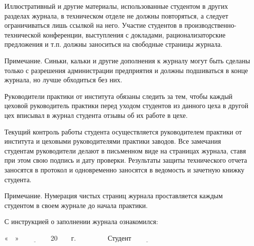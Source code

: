 Иллюстративный и другие материалы, использованные студентом в других разделах журнала, в техническом отделе не должны повторяться, а следует  ограничиваться лишь ссылкой на него. Участие студентов в производственно-технической конференции, выступления с докладами, рационализаторские предложения и т.п. должны заноситься на свободные страницы журнала.


Примечание. Синьки, кальки и другие дополнения к журналу могут быть сделаны только с разрешения администрации предприятия и должны подшиваться в конце журнала, но лучше обходиться без них.

Руководители практики от института обязаны следить за тем, чтобы каждый цеховой руководитель практики перед уходом студентов из данного цеха в другой цех вписывал в журнал студента  отзывы об их работе в цехе.

Текущий контроль работы студента осуществляется руководителем практики от института и цеховыми руководителями практики заводов. Все замечания студентам руководители делают в письменном виде на страницах журнала, ставя при этом свою подпись и дату проверки. Результаты защиты технического отчета заносятся в протокол и одновременно заносятся в ведомость и зачетную книжку студента.

Примечание. Нумерация чистых страниц журнала проставляется каждым студентом в своем журнале до начала практики.
 

С инструкцией о заполнении журнала ознакомился:

\vspace{1em}

«$\quad$» $\underline{\qquad \qquad}$ 20$\qquad$г.	$\qquad \qquad$			Студент $\underline{\qquad \qquad}$